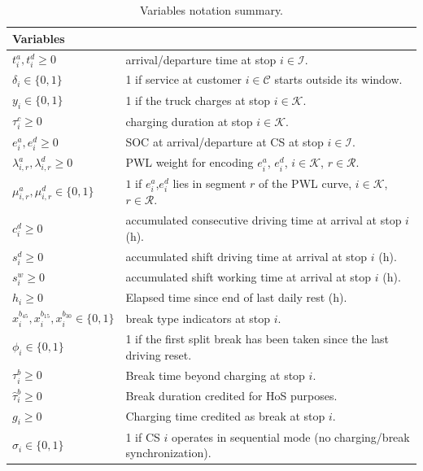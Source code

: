 \documentclass[preprint,12pt,3p]{elsarticle}
\begin{document}
\begin{table}[h!]
\centering
\caption{Variables notation summary.}
\label{tab:notation-mini2}
\small
\begin{tabular}{p{0.25\linewidth}p{0.75\linewidth}}
\toprule
\multicolumn{2}{l}{\textbf{Variables}}\\
\midrule
$t_i^a,t_i^d \geq 0$ & arrival/departure time at stop $ i \in \mathcal{I}$. \\
$\delta_i \in \{0,1\}$ & 1 if service at customer $ i \in \mathcal{C}$ starts outside its window.\\

$y_i \in \{0,1\}$ & 1 if the truck charges at stop $ i \in \mathcal{K}$.\\
$\tau_i^c \geq 0$ & charging duration at stop $ i \in \mathcal{K}$.\\
$e_i^a, e_i^d \geq 0$ & SOC at arrival/departure at CS at stop $ i \in \mathcal{I}$.\\

$\lambda_{i,r}^{a},\lambda_{i,r}^{d} \geq 0$ & PWL weight for encoding $e_i^a$, $e_i^d$, $i \in \mathcal{K}$, $r \in \mathcal{R}$.\\
$\mu_{i,r}^{a},\mu_{i,r}^{d} \in \{0,1\}$ & $1$ if $e_i^a$,$e_i^d$ lies in segment $r$ of the PWL curve, $i \in \mathcal{K}$, $r \in \mathcal{R}$.\\

$c_i^d \geq 0$ & accumulated consecutive driving time at arrival at stop $i$ (h).\\
$s_i^d \geq 0$ & accumulated shift driving time at arrival at stop $i$ (h).\\
$s_i^w \geq 0$ & accumulated shift working time at arrival at stop $i$ (h).\\
$h_i \geq 0$ & Elapsed time since end of last daily rest (h).\\

$x_i^{b_{45}}, x_i^{b_{15}}, x_i^{b_{30}} \in \{0,1\}$ & break type indicators at stop $i$. \\
$\phi_i \in \{0,1\}$&  1 if the first split break has been taken since the last driving reset.\\
$\tau_i^{b} \geq 0$& Break time beyond charging at stop $i$. \\
$\hat{\tau}_i^{b} \geq 0$& Break duration credited for HoS purposes. \\
$g_i \geq 0$ & Charging time credited as break at stop $i$. \\
$\sigma_i \in \{0,1\}$ & 1 if CS $i$ operates in sequential mode (no charging/break synchronization).\\



\end{tabular}
\end{table}
\end{document}
